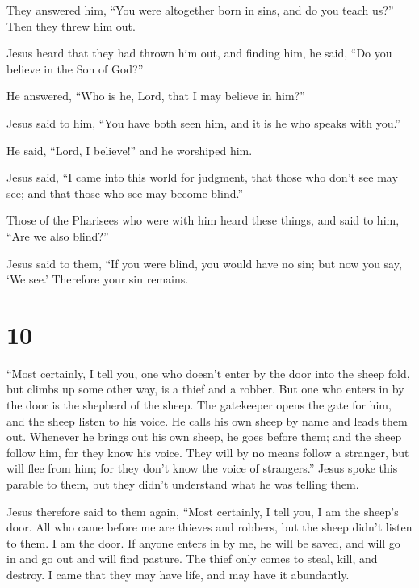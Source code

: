  They answered him, ``You were altogether born in sins,
and do you teach us?'' Then they threw him out.

 Jesus heard that they had thrown him out, and finding
him, he said, ``Do you believe in the Son of God?''

 He answered, ``Who is he, Lord, that I may believe in
him?''

 Jesus said to him, ``You have both seen him, and it is
he who speaks with you.''

 He said, ``Lord, I believe!'' and he worshiped him.

 Jesus said, ``I came into this world for judgment, that
those who don't see may see; and that those who see may become blind.''

 Those of the Pharisees who were with him heard these
things, and said to him, ``Are we also blind?''

 Jesus said to them, ``If you were blind, you would have
no sin; but now you say, `We see.' Therefore your sin remains.

\hypertarget{section-9}{%
\section{10}\label{section-9}}

 ``Most certainly, I tell you, one who doesn't enter by
the door into the sheep fold, but climbs up some other way, is a thief
and a robber.  But one who enters in by the door is the
shepherd of the sheep.  The gatekeeper opens the gate for
him, and the sheep listen to his voice. He calls his own sheep by name
and leads them out.  Whenever he brings out his own sheep,
he goes before them; and the sheep follow him, for they know his voice.
 They will by no means follow a stranger, but will flee
from him; for they don't know the voice of strangers.'' 
Jesus spoke this parable to them, but they didn't understand what he was
telling them.

 Jesus therefore said to them again, ``Most certainly, I
tell you, I am the sheep's door.  All who came before me
are thieves and robbers, but the sheep didn't listen to them.
 I am the door. If anyone enters in by me, he will be
saved, and will go in and go out and will find pasture. 
The thief only comes to steal, kill, and destroy. I came that they may
have life, and may have it abundantly.

